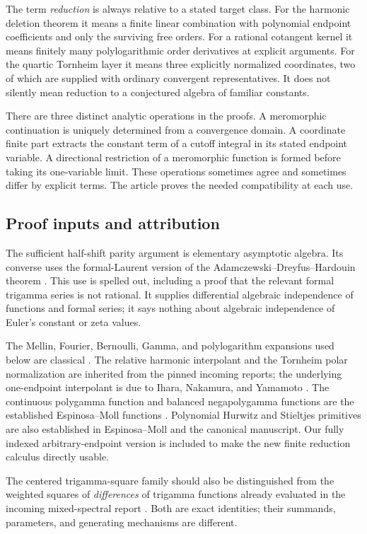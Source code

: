 \documentclass[11pt,a4paper]{article}
\numberwithin{equation}{section}
\theoremstyle{definition}
\theoremstyle{remark}
\begin{document}
The term \emph{reduction} is always relative to a stated target class.
For the harmonic deletion theorem it means a finite linear combination
with polynomial endpoint coefficients and only the surviving free
orders. For a rational cotangent kernel it means finitely many
polylogarithmic order derivatives at explicit arguments. For the
quartic Tornheim layer it means three explicitly normalized
coordinates, two of which are supplied with ordinary convergent
representatives. It does not silently mean reduction to a conjectured
algebra of familiar constants.

There are three distinct analytic operations in the proofs.
A meromorphic continuation is uniquely determined from a convergence
domain. A coordinate finite part extracts the constant term of a
cutoff integral in its stated endpoint variable. A directional
restriction of a meromorphic function is formed before taking its
one-variable limit. These operations sometimes agree and sometimes
differ by explicit terms. The article proves the needed compatibility
at each use.

\subsection{Proof inputs and attribution}

The sufficient half-shift parity argument is elementary asymptotic
algebra. Its converse uses the formal-Laurent version of the
Adamczewski--Dreyfus--Hardouin theorem
\cite[Theorem~1.2]{ghp:ADH}. This use is spelled out, including a
proof that the relevant formal trigamma series is not rational.
It supplies differential algebraic independence of functions and
formal series; it says nothing about algebraic independence of
Euler's constant or zeta values.

The Mellin, Fourier, Bernoulli, Gamma, and polylogarithm expansions
used below are classical \cite{DLMF}. The relative harmonic
interpolant and the Tornheim polar normalization are inherited from
the pinned incoming reports; the underlying one-endpoint
interpolant is due to Ihara, Nakamura, and Yamamoto \cite{harm:INY}.
The continuous polygamma function and balanced negapolygamma functions
are the established Espinosa--Moll functions \cite{EM}.
Polynomial Hurwitz and Stieltjes primitives are also established
in Espinosa--Moll \cite{harm:EM} and the canonical manuscript.
Our fully indexed arbitrary-endpoint version is included to make the
new finite reduction calculus directly usable.

The centered trigamma-square family should also be distinguished
from the weighted squares of \emph{differences} of trigamma functions
already evaluated in the incoming mixed-spectral report
\cite{source:Mixed}. Both are exact identities; their summands,
parameters, and generating mechanisms are different.
\end{document}
